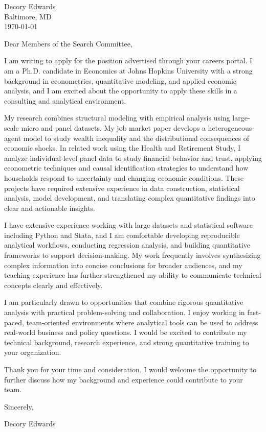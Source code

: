 \documentclass[11pt]{article}
\begin{document}
Decory Edwards \\
Baltimore, MD \\
\today

\vspace{1em}

Dear Members of the Search Committee,

\vspace{0.5em}

I am writing to apply for the position advertised through your careers portal. I am a Ph.D. candidate in Economics at Johns Hopkins University with a strong background in econometrics, quantitative modeling, and applied economic analysis, and I am excited about the opportunity to apply these skills in a consulting and analytical environment.

\vspace{0.5em}

My research combines structural modeling with empirical analysis using large-scale micro and panel datasets. My job market paper develops a heterogeneous-agent model to study wealth inequality and the distributional consequences of economic shocks. In related work using the Health and Retirement Study, I analyze individual-level panel data to study financial behavior and trust, applying econometric techniques and causal identification strategies to understand how households respond to uncertainty and changing economic conditions. These projects have required extensive experience in data construction, statistical analysis, model development, and translating complex quantitative findings into clear and actionable insights.

\vspace{0.5em}

I have extensive experience working with large datasets and statistical software including Python and Stata, and I am comfortable developing reproducible analytical workflows, conducting regression analysis, and building quantitative frameworks to support decision-making. My work frequently involves synthesizing complex information into concise conclusions for broader audiences, and my teaching experience has further strengthened my ability to communicate technical concepts clearly and effectively.

\vspace{0.5em}

I am particularly drawn to opportunities that combine rigorous quantitative analysis with practical problem-solving and collaboration. I enjoy working in fast-paced, team-oriented environments where analytical tools can be used to address real-world business and policy questions. I would be excited to contribute my technical background, research experience, and strong quantitative training to your organization.

\vspace{0.5em}

Thank you for your time and consideration. I would welcome the opportunity to further discuss how my background and experience could contribute to your team.

\vspace{1em}

Sincerely,

\vspace{1em}

Decory Edwards
\end{document}
